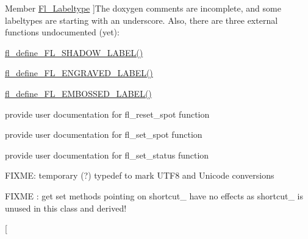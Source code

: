 \begin{DoxyRefList}
Member \hyperlink{_enumerations_8_h_ad5774781d33328b82990ff9e25dfd61b}{Fl\+\_\+\+Labeltype} ]The doxygen comments are incomplete, and some labeltypes are starting with an underscore. Also, there are three external functions undocumented (yet)\+:
\begin{DoxyItemize}
\item \hyperlink{_enumerations_8_h_acceca4e5fa60fae68ee0098bd9f44124}{fl\+\_\+define\+\_\+\+F\+L\+\_\+\+S\+H\+A\+D\+O\+W\+\_\+\+L\+A\+B\+E\+L()}
\item \hyperlink{_enumerations_8_h_ad2356471e464dcdc818929365be0781e}{fl\+\_\+define\+\_\+\+F\+L\+\_\+\+E\+N\+G\+R\+A\+V\+E\+D\+\_\+\+L\+A\+B\+E\+L()}
\item \hyperlink{_enumerations_8_h_a323a068ca36b789472bfb8e50e155b93}{fl\+\_\+define\+\_\+\+F\+L\+\_\+\+E\+M\+B\+O\+S\+S\+E\+D\+\_\+\+L\+A\+B\+E\+L()}  
\end{DoxyItemize}
\item[\label{todo__todo000015}%
\Hypertarget{todo__todo000015}%
Member \hyperlink{group__fl__drawings_gaa6c8068dbc30f05765330e31f08350d7}{fl\+\_\+reset\+\_\+spot} (void)]provide user documentation for fl\+\_\+reset\+\_\+spot function  
\item[\label{todo__todo000014}%
\Hypertarget{todo__todo000014}%
Member \hyperlink{group__fl__drawings_ga748fcead12c8cc67cb517cab02c273a2}{fl\+\_\+set\+\_\+spot} (int font, int size, int X, int Y, int W, int H, \hyperlink{class_fl___window}{Fl\+\_\+\+Window} $\ast$win=0)]provide user documentation for fl\+\_\+set\+\_\+spot function  
\item[\label{todo__todo000013}%
\Hypertarget{todo__todo000013}%
Member \hyperlink{group__fl__drawings_ga496c7d22ad30fe84717bb765dd6d1fc8}{fl\+\_\+set\+\_\+status} (int X, int Y, int W, int H)]provide user documentation for fl\+\_\+set\+\_\+status function  
\item[\label{todo__todo000019}%
\Hypertarget{todo__todo000019}%
Member \hyperlink{fl__types_8h_af1e24dee50aaad72d85c462eefbc2f68}{Fl\+\_\+\+String} ]F\+I\+X\+ME\+: temporary (?) typedef to mark U\+T\+F8 and Unicode conversions  
\item[\label{todo__todo000018}%
\Hypertarget{todo__todo000018}%
Member \hyperlink{class_fl___text___display_a3ec453b6dc9cc468619688c5bdf3dc95}{Fl\+\_\+\+Text\+\_\+\+Display\+:\+:shortcut} (int s)]F\+I\+X\+ME \+: get set methods pointing on shortcut\+\_\+ have no effects as shortcut\+\_\+ is unused in this class and derived!  
\item[\label{todo__todo000017}%
%

\end{DoxyRefList}
